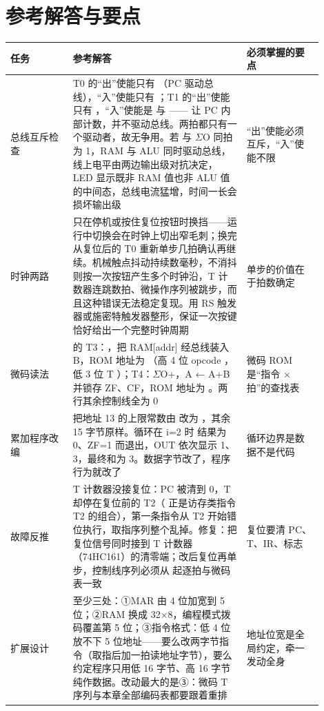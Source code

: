 \section*{参考解答与要点}

\begin{longtable}{L{0.18\linewidth}L{0.5\linewidth}L{0.22\linewidth}}
\toprule
任务 & 参考解答 & 必须掌握的要点 \\
\midrule
总线互斥检查 & T0 的“出”使能只有 （PC 驱动总线），“入”使能只有 ；T1 的“出”使能只有 ，“入”使能是  与 —— 让 PC 内部计数，并不驱动总线。两拍都只有一个驱动者，故无争用。若  与 $\Sigma$O 同拍为 1，RAM 与 ALU 同时驱动总线，线上电平由两边输出级对抗决定，LED 显示既非 RAM 值也非 ALU 值的中间态，总线电流猛增，时间一长会损坏输出级 & “出”使能必须互斥，“入”使能不限 \\
时钟两路 & 只在停机或按住复位按钮时换挡——运行中切换会在时钟上切出窄毛刺；换完从复位后的 T0 重新单步几拍确认再继续。机械触点抖动持续数毫秒，不消抖则按一次按钮产生多个时钟沿，T 计数器连跳数拍、微操作序列被跳步，而且这种错误无法稳定复现。用 RS 触发器或施密特触发器整形，保证一次按键恰好给出一个完整时钟周期 & 单步的价值在于拍数确定 \\
微码读法 &  的 T3：，把 RAM[addr] 经总线装入 B，ROM 地址为 （高 4 位 opcode ，低 3 位 T ）；T4：$\Sigma$O+，A ← A+B 并锁存 ZF、CF，ROM 地址为 。两行其余控制线全为 0 & 微码 ROM 是“指令 × 拍”的查找表 \\
累加程序改编 & 把地址 13 的上限常数由  改为 ，其余 15 字节原样。循环在 i=2 时  结果为 0、ZF=1 而退出，OUT 依次显示 1、3，最终和为 3。数据字节改了，程序行为就改了 & 循环边界是数据不是代码 \\
故障反推 & T 计数器没接复位：PC 被清到 0，T 却停在复位前的 T2（ 正是访存类指令 T2 的组合），第一条指令从 T2 开始错位执行，取指序列整个乱掉。修复：把复位信号同时接到 T 计数器（74HC161）的清零端；改后复位再单步，控制线序列必须从  起逐拍与微码表一致 & 复位要清 PC、T、IR、标志 \\
扩展设计 & 至少三处：①MAR 由 4 位加宽到 5 位；②RAM 换成 32×8，编程模式拨码覆盖第 5 位；③指令格式：低 4 位放不下 5 位地址——要么改两字节指令（取指后加一拍读地址字节），要么约定程序只用低 16 字节、高 16 字节纯作数据。改动最大的是③：微码 T 序列与本章全部编码表都要跟着重排 & 地址位宽是全局约定，牵一发动全身 \\
\bottomrule
\end{longtable}
